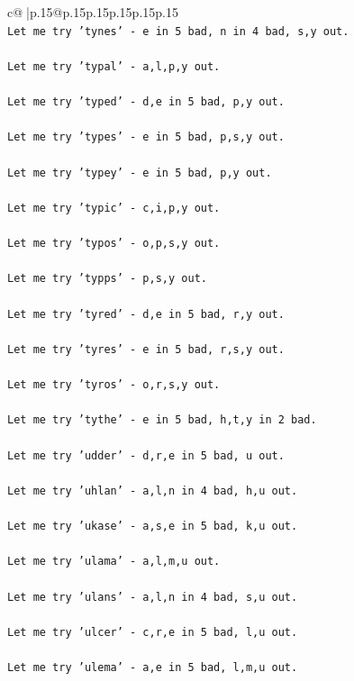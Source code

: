 \documentclass{article}
\begin{document}
{\begin{supertabular}{c@{$\;$}|p{.15\linewidth}@{}p{.15\linewidth}p{.15\linewidth}p{.15\linewidth}p{.15\linewidth}p{.15\linewidth}}
{{{\\ 
\texttt{Let me try 'tynes' {-} e in 5 bad, n in 4 bad, s,y out. } \\
\\ 
\texttt{Let me try 'typal' {-} a,l,p,y out. } \\
\\ 
\texttt{Let me try 'typed' {-} d,e in 5 bad, p,y out. } \\
\\ 
\texttt{Let me try 'types' {-} e in 5 bad, p,s,y out. } \\
\\ 
\texttt{Let me try 'typey' {-} e in 5 bad, p,y out. } \\
\\ 
\texttt{Let me try 'typic' {-} c,i,p,y out. } \\
\\ 
\texttt{Let me try 'typos' {-} o,p,s,y out. } \\
\\ 
\texttt{Let me try 'typps' {-} p,s,y out. } \\
\\ 
\texttt{Let me try 'tyred' {-} d,e in 5 bad, r,y out. } \\
\\ 
\texttt{Let me try 'tyres' {-} e in 5 bad, r,s,y out. } \\
\\ 
\texttt{Let me try 'tyros' {-} o,r,s,y out. } \\
\\ 
\texttt{Let me try 'tythe' {-} e in 5 bad, h,t,y in 2 bad. } \\
\\ 
\texttt{Let me try 'udder' {-} d,r,e in 5 bad, u out. } \\
\\ 
\texttt{Let me try 'uhlan' {-} a,l,n in 4 bad, h,u out. } \\
\\ 
\texttt{Let me try 'ukase' {-} a,s,e in 5 bad, k,u out. } \\
\\ 
\texttt{Let me try 'ulama' {-} a,l,m,u out. } \\
\\ 
\texttt{Let me try 'ulans' {-} a,l,n in 4 bad, s,u out. } \\
\\ 
\texttt{Let me try 'ulcer' {-} c,r,e in 5 bad, l,u out. } \\
\\ 
\texttt{Let me try 'ulema' {-} a,e in 5 bad, l,m,u out. } \\
}}}
\end{supertabular}}
\end{document}
